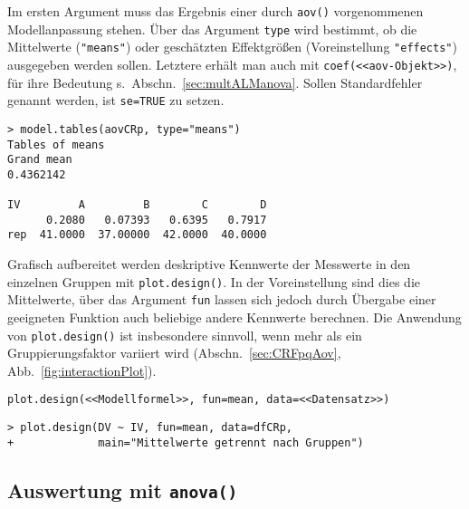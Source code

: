 Im ersten Argument muss das Ergebnis einer durch \lstinline!aov()! vorgenommenen Modellanpassung stehen. Über das Argument \lstinline!type! wird bestimmt, ob die Mittelwerte (\lstinline!"means"!) oder geschätzten Effektgrößen (Voreinstellung \lstinline!"effects"!) ausgegeben werden sollen. Letztere erhält man auch mit \lstinline!coef(<<aov-Objekt>>)!, für ihre Bedeutung s.\ Abschn.\ \ref{sec:multALManova}. Sollen Standardfehler genannt werden, ist \lstinline!se=TRUE! zu setzen.
\begin{lstlisting}
> model.tables(aovCRp, type="means")
Tables of means
Grand mean
0.4362142

IV         A         B        C        D
      0.2080   0.07393   0.6395   0.7917
rep  41.0000  37.00000  42.0000  40.0000
\end{lstlisting}

Grafisch aufbereitet werden deskriptive Kennwerte der Messwerte in den einzelnen Gruppen mit \lstinline!plot.design()!. In der Voreinstellung sind dies die Mittelwerte, über das Argument \lstinline!fun! lassen sich jedoch durch Übergabe einer geeigneten Funktion auch beliebige andere Kennwerte berechnen. Die Anwendung von \lstinline!plot.design()! ist insbesondere sinnvoll, wenn mehr als ein Gruppierungsfaktor variiert wird (Abschn.\ \ref{sec:CRFpqAov}, Abb.\ \ref{fig:interactionPlot}).
\begin{lstlisting}
plot.design(<<Modellformel>>, fun=mean, data=<<Datensatz>>)
\end{lstlisting}

\begin{lstlisting}
> plot.design(DV ~ IV, fun=mean, data=dfCRp,
+             main="Mittelwerte getrennt nach Gruppen")
\end{lstlisting}

\subsection{Auswertung mit \texttt{anova()}}
\label{sec:anova}

